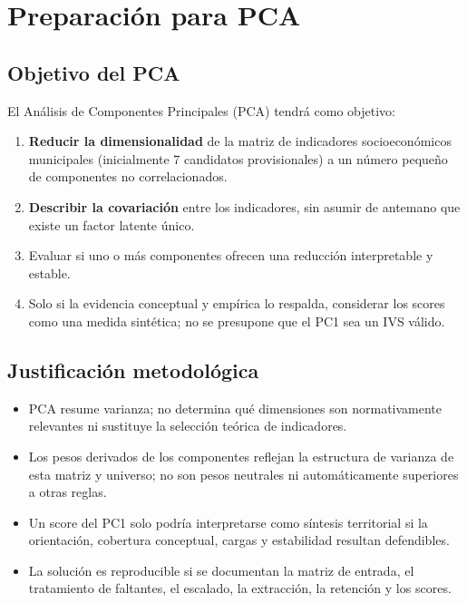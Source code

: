 \section{Preparación para PCA}
\label{ch:preparacion_pca}

\subsection{Objetivo del PCA}
\label{sec:objetivo_pca}

El Análisis de Componentes Principales (PCA) tendrá como objetivo:

\begin{enumerate}
    \item \textbf{Reducir la dimensionalidad} de la matriz de indicadores socioeconómicos municipales (inicialmente 7 candidatos provisionales) a un número pequeño de componentes no correlacionados.
    \item \textbf{Describir la covariación} entre los indicadores, sin asumir de antemano que existe un factor latente único.
    \item Evaluar si uno o más componentes ofrecen una reducción interpretable y estable.
    \item Solo si la evidencia conceptual y empírica lo respalda, considerar los scores como una medida sintética; no se presupone que el PC1 sea un IVS válido.
\end{enumerate}

\subsection{Justificación metodológica}
\label{sec:justificacion_pca}

\begin{itemize}
    \item PCA resume varianza; no determina qué dimensiones son normativamente relevantes ni sustituye la selección teórica de indicadores.
    \item Los pesos derivados de los componentes reflejan la estructura de varianza de esta matriz y universo; no son pesos neutrales ni automáticamente superiores a otras reglas.
    \item Un score del PC1 solo podría interpretarse como síntesis territorial si la orientación, cobertura conceptual, cargas y estabilidad resultan defendibles.
    \item La solución es reproducible si se documentan la matriz de entrada, el tratamiento de faltantes, el escalado, la extracción, la retención y los scores.
\end{itemize}

